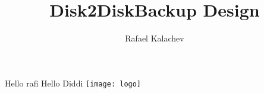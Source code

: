\documentclass[12pt]{article}
\title{Disk2DiskBackup Design}
\author{Rafael Kalachev}
\begin{document}
Hello rafi
Hello Diddi
\texttt{[image: logo]}
\end{document}
